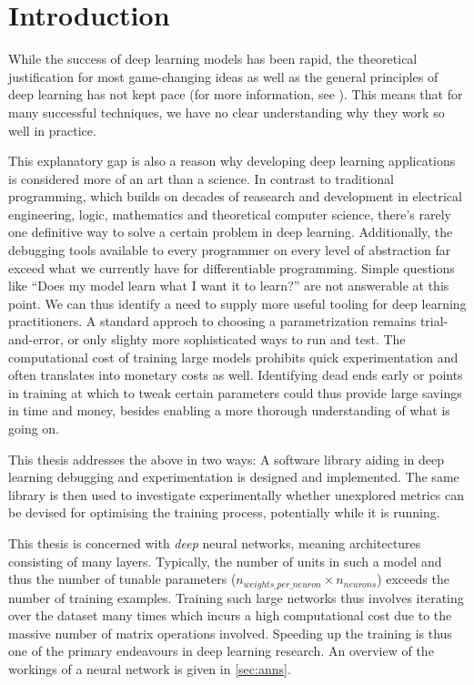 \chapter{Introduction}\label{sec:introduction}

While the success of deep learning models has been rapid, the theoretical
justification for most game-changing ideas as well as the general principles of
deep learning has not kept pace (for more information, see \cite{arora2018}).
This means that for many successful techniques, we have no clear understanding
why they work so well in practice.

This explanatory gap is also a reason why developing deep learning applications
is considered more of an art than a science. In contrast to traditional
programming, which builds on decades of reasearch and development in electrical
engineering, logic, mathematics and theoretical computer science, there's rarely
one definitive way to solve a certain problem in deep learning.  Additionally,
the debugging tools available to every programmer on every level of abstraction
far exceed what we currently have for differentiable programming. Simple
questions like ``Does my model learn what I want it to learn?'' are not
answerable at this point.  We can thus identify a need to supply more useful
tooling for deep learning practitioners.  A standard approch to choosing a
parametrization remains trial-and-error, or only slighty more sophisticated ways
to run and test.  The computational cost of training large models prohibits
quick experimentation and often translates into monetary costs as well.
Identifying dead ends early or points in training at which to tweak certain
parameters could thus provide large savings in time and money, besides enabling
a more thorough understanding of what is going on.

This thesis addresses the above in two ways: A software library aiding in deep
learning debugging and experimentation is designed and implemented. The same
library is then used to investigate experimentally whether unexplored
metrics can be devised for optimising the training process, potentially while it
is running.

This thesis is concerned with \emph{deep} neural networks, meaning
architectures consisting of many layers. Typically, the number of units
in such a model and thus the number of tunable parameters
(\(n_{weights\_per\_neuron} \times n_{neurons}\)) exceeds the number of
training examples. Training such large networks thus involves iterating
over the dataset many times which incurs a high computational cost due
to the massive number of matrix operations involved. Speeding up the
training is thus one of the primary endeavours in deep learning
research. An overview of the workings of a neural network is given in
\cref{sec:anns}.

